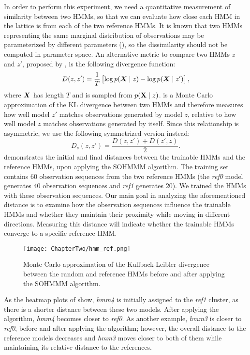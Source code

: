 In order to perform this experiment, we need a quantitative measurement of similarity between two HMMs, so that we can evaluate how close each HMM in the lattice is from each of the two reference HMMs. It is known that two HMMs representing the same marginal distribution of observations may be parameterized by different parameters (\citet{Rabiner1989}), so the dissimilarity should not be computed in parameter space. An alternative metric to compare two HMMs $z$ and $z'$, proposed by \citet{Juang1985}, is the following divergence function:
\begin{equation}
    D(z, z') = \frac{1}{T}\left[\log p({\bm{X}} \mid z) - \log p({\bm{X}} \mid z')\right],
    \label{eq:hmm_div}
\end{equation}
where ${\bm{X}}$ has length $T$ and is sampled from $p({\mathbf{X}} \mid z)$.  is a Monte Carlo approximation of the KL divergence between two HMMs and therefore measures how well model $z'$ matches observations generated by model $z$, relative to how well model $z$ matches observations generated by itself. Since this relationship is asymmetric, we use the following symmetrized version instead:
\begin{equation}
    D_{s}(z,z') = \frac{D(z,z')+D(z',z)}{2}.
    \label{eq:hmm_div_sym}
\end{equation}
 demonstrates the initial and final distances between the trainable HMMs and the reference HMMs, upon applying the SOHMMM algorithm. The training set contains 60 observation sequences from the two reference HMMs (the \textit{ref0} model generates 40 observation sequences and \textit{ref1} generates 20). We trained the HMMs with these observation sequences.
Our main goal in analyzing the aforementioned distance is to examine how the observation sequences influence the trainable HMMs and whether they maintain their proximity while moving in different directions. Measuring this distance will indicate whether the trainable HMMs converge to a specific reference HMM.

\begin{figure}[h]
    \centering
    \texttt{[image: ChapterTwo/hmm\_ref.png]}
    \caption{Monte Carlo approximation of the Kullback-Leibler divergence between the random and reference HMMs before and after applying the SOHMMM algorithm.}
    \label{fig:sohmmm_distances}
\end{figure}

As the heatmap plots of  show, \textit{hmm4} is initially assigned to the \textit{ref1} cluster, as there is a shorter distance between these two models. After applying the algorithm, \textit{hmm4} becomes closer to \textit{ref0}. As another example, \textit{hmm3} is closer to \textit{ref0}, before and after applying the algorithm; however, the overall distance to the reference models decreases and \textit{hmm3} moves closer to both of them while maintaining its relative distance to the references.

